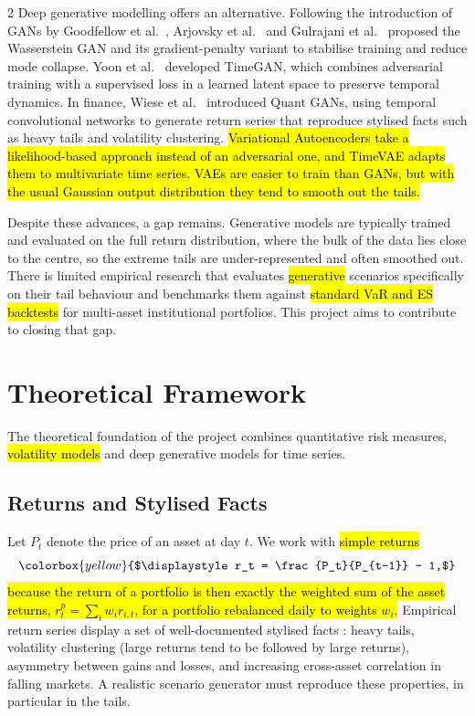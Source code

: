 \documentclass[12pt]{spieman}  %
\newcommand{\new}[1]{\hl{#1}}
\newcommand{\neweq}[1]{\colorbox{yellow}{$\displaystyle #1$}}
\begin{document}
\begin{spacing}{2}
Deep generative modelling offers an alternative. Following the introduction of GANs by Goodfellow et al.\ \cite{Goodfellow14}, Arjovsky et al.\ \cite{Arjovsky17} and Gulrajani et al.\ \cite{Gulrajani17} proposed the Wasserstein GAN and its gradient-penalty variant to stabilise training and reduce mode collapse. Yoon et al.\ \cite{Yoon19} developed TimeGAN, which combines adversarial training with a supervised loss in a learned latent space to preserve temporal dynamics. In finance, Wiese et al.\ \cite{Wiese20} introduced Quant GANs, using temporal convolutional networks to generate return series that reproduce stylised facts such as heavy tails and volatility clustering. \new{Variational Autoencoders \cite{KingmaWelling14} take a likelihood-based approach instead of an adversarial one, and TimeVAE \cite{Desai21} adapts them to multivariate time series. VAEs are easier to train than GANs, but with the usual Gaussian output distribution they tend to smooth out the tails.}

Despite these advances, a gap remains. Generative models are typically trained and evaluated on the full return distribution, where the bulk of the data lies close to the centre, so the extreme tails are under-represented and often smoothed out. There is limited empirical research that evaluates \new{generative} scenarios specifically on their tail behaviour and benchmarks them against \new{standard VaR and ES backtests} for multi-asset institutional portfolios. This project aims to contribute to closing that gap.

\section{Theoretical Framework}
\label{sect:theory}

The theoretical foundation of the project combines quantitative risk measures, \new{volatility models} and deep generative models for time series.

\subsection{Returns and Stylised Facts}

Let $P_t$ denote the price of an asset at day $t$. We work with \new{simple returns}
\begin{equation}
\neweq{r_t = \frac{P_t}{P_{t-1}} - 1,}
\end{equation}
\new{because the return of a portfolio is then exactly the weighted sum of the asset returns, $r^{p}_t = \sum_i w_i r_{i,t}$, for a portfolio rebalanced daily to weights $w_i$.} Empirical return series display a set of well-documented stylised facts \cite{Cont01}: heavy tails, volatility clustering (large returns tend to be followed by large returns), asymmetry between gains and losses, and increasing cross-asset correlation in falling markets. A realistic scenario generator must reproduce these properties, in particular in the tails.


\end{spacing}
\end{document}
